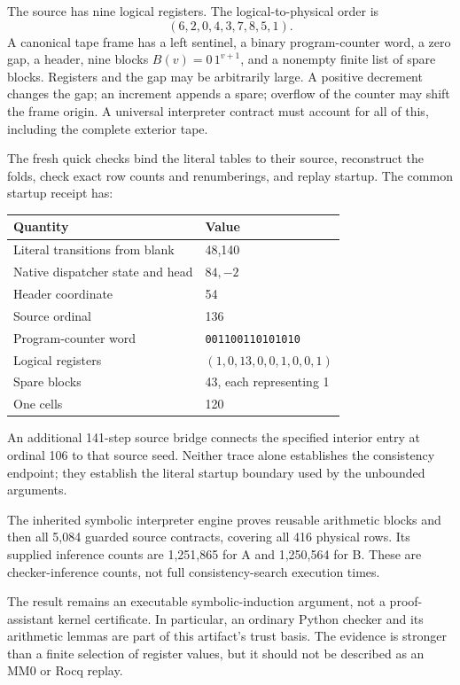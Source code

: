 \documentclass[11pt,a4paper]{article}
\theoremstyle{definition}
\begin{document}
The source has nine logical registers. The logical-to-physical order is
\[
(6,2,0,4,3,7,8,5,1).
\]
A canonical tape frame has a left sentinel, a binary program-counter word, a zero gap, a header, nine blocks $B(v)=0\,1^{v+1}$, and a nonempty finite list of spare blocks. Registers and the gap may be arbitrarily large. A positive decrement changes the gap; an increment appends a spare; overflow of the counter may shift the frame origin. A universal interpreter contract must account for all of this, including the complete exterior tape.

The fresh quick checks bind the literal tables to their source, reconstruct the folds, check exact row counts and renumberings, and replay startup. The common startup receipt has:
\begin{center}
\begin{tabular}{@{}ll@{}}
\toprule
Quantity & Value\\
\midrule
Literal transitions from blank & 48,140\\
Native dispatcher state and head & $84,-2$\\
Header coordinate & 54\\
Source ordinal & 136\\
Program-counter word & \texttt{001100110101010}\\
Logical registers & $(1,0,13,0,0,1,0,0,1)$\\
Spare blocks & 43, each representing 1\\
One cells & 120\\
\bottomrule
\end{tabular}
\end{center}
An additional 141-step source bridge connects the specified interior entry at ordinal 106 to that source seed. Neither trace alone establishes the consistency endpoint; they establish the literal startup boundary used by the unbounded arguments.

The inherited symbolic interpreter engine proves reusable arithmetic blocks and then all 5,084 guarded source contracts, covering all 416 physical rows. Its supplied inference counts are 1,251,865 for A and 1,250,564 for B. These are checker-inference counts, not full consistency-search execution times.



The result remains an executable symbolic-induction argument, not a proof-assistant kernel certificate. In particular, an ordinary Python checker and its arithmetic lemmas are part of this artifact's trust basis. The evidence is stronger than a finite selection of register values, but it should not be described as an MM0 or Rocq replay.
\end{document}
